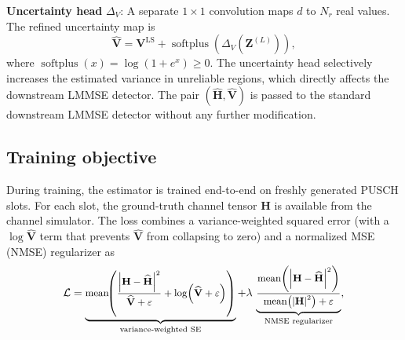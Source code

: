 \documentclass[conference,letterpaper]{IEEEtran}
\begin{document}
	\textbf{Uncertainty head} $\Delta_V$: A separate $1\times1$ convolution maps $d$ to $N_r$ real values.
	The refined uncertainty map is
	\begin{equation}
		\label{eq:variance_head}
		\widehat{\mathbf{V}}
		=
		\mathbf{V}^{\mathrm{LS}}
		+
		\operatorname{softplus}\!\left(\Delta_V\!\left(\mathbf{Z}^{(L)}\right)\right),
	\end{equation}
	where $\operatorname{softplus}(x)=\log(1+e^x)\geq 0$. The uncertainty head selectively increases the estimated variance in unreliable regions, which directly affects the downstream LMMSE detector.
	The pair $(\widehat{\mathbf{H}},\widehat{\mathbf{V}})$ is passed to the standard downstream LMMSE detector without any further modification.
	\vspace{-.1cm}
	\subsection{Training objective}
	During training, the estimator is trained end-to-end on freshly generated PUSCH slots.
	For each slot, the ground-truth channel tensor $\mathbf{H}$ is available from the channel simulator.
	The loss combines a variance-weighted squared error (with a $\log\widehat{\mathbf{V}}$ term that prevents $\widehat{\mathbf{V}}$ from collapsing to zero) and a normalized MSE (NMSE) regularizer as
	\begin{equation}
		\label{eq:training_loss}
		\small
		\mathcal{L}
		=
		\underbrace{
			\operatorname{mean}\!\!\left(
			\frac{\left|\mathbf{H}-\widehat{\mathbf{H}}\right|^2}{\widehat{\mathbf{V}}+\varepsilon}
			+
			\log\!\left(\widehat{\mathbf{V}}+\varepsilon\right)
			\right)
		}_{\text{variance-weighted SE}}
		+
		\lambda\,
		\underbrace{
			\frac{
				\operatorname{mean}\!\left(\left|\mathbf{H}-\widehat{\mathbf{H}}\right|^2\right)
			}{
				\operatorname{mean}\!\left(\left|\mathbf{H}\right|^2\right)+\varepsilon
			}
		}_{\text{NMSE regularizer}},
	\end{equation}
\end{document}

